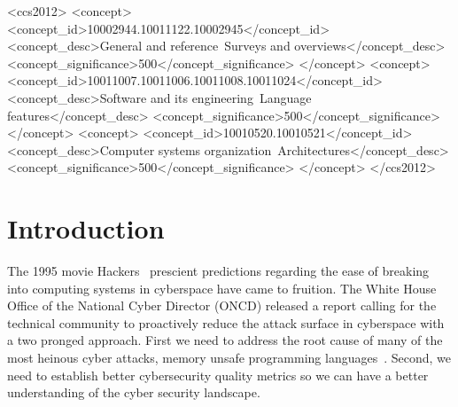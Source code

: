 \documentclass[sigconf]{acmart}
\begin{document}
\begin{CCSXML}
<ccs2012>
<concept>
<concept_id>10002944.10011122.10002945</concept_id>
<concept_desc>General and reference~Surveys and overviews</concept_desc>
<concept_significance>500</concept_significance>
</concept>
<concept>
<concept_id>10011007.10011006.10011008.10011024</concept_id>
<concept_desc>Software and its engineering~Language features</concept_desc>
<concept_significance>500</concept_significance>
</concept>
<concept>
<concept_id>10010520.10010521</concept_id>
<concept_desc>Computer systems organization~Architectures</concept_desc>
<concept_significance>500</concept_significance>
</concept>
</ccs2012>
\end{CCSXML}






\maketitle

\section{Introduction}

The 1995 movie Hackers~\cite{Wikipedia_contributors2024-zr} prescient predictions regarding the ease
of breaking into computing systems in cyberspace have came to fruition. The White House Office of
the National Cyber Director (ONCD) released a report calling for the technical community to
proactively reduce the attack surface in cyberspace with a two pronged approach. First we need to
address the root cause of many of the most heinous cyber attacks, memory unsafe programming
languages~\cite{United_States_Gov2024-pp}. Second, we need to establish better cybersecurity quality
metrics so we can have a better understanding of the cyber security landscape.
\end{document}
